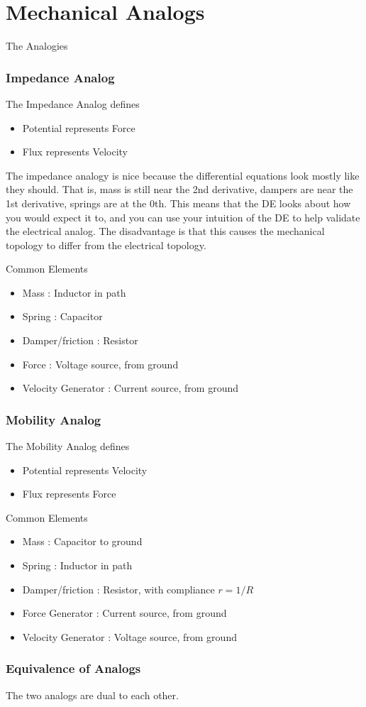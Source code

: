 \documentclass{../templates/topic}
\begin{document}
\chapter{Mechanical Analogs}

\begin{section}{The Analogies}
	\subsection{Impedance Analog}
		The Impedance Analog defines
		\begin{itemize}
			\item Potential represents Force
			\item Flux represents Velocity
		\end{itemize}
		The impedance analogy is nice because the differential equations look mostly like they should. That is, mass is still near the 2nd derivative, dampers are near the 1st derivative, springs are at the 0th. This means that the DE looks about how you would expect it to, and you can use your intuition of the DE to help validate the electrical analog. The disadvantage is that this causes the mechanical topology to differ from the electrical topology.
		
		Common Elements
		\begin{itemize}
			\item Mass : Inductor in path
			\item Spring : Capacitor
			\item Damper/friction : Resistor
			\item Force : Voltage source, from ground
			\item Velocity Generator : Current source, from ground
		\end{itemize}

	\subsection{Mobility Analog}
		The Mobility Analog defines
		\begin{itemize}
			\item Potential represents Velocity
			\item Flux represents Force
		\end{itemize}
		
		Common Elements
		\begin{itemize}
			\item Mass : Capacitor to ground
			\item Spring : Inductor in path
			\item Damper/friction : Resistor, with compliance $r = 1/R$
			\item Force Generator : Current source, from ground
			\item Velocity Generator : Voltage source, from ground
		\end{itemize}
		
	\subsection{Equivalence of Analogs}
		The two analogs are dual to each other.

\end{section}
\end{document}
